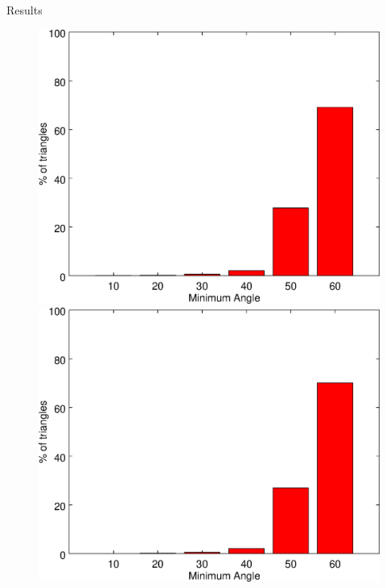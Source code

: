 \documentclass{beamer}
\begin{document}
\begin{frame}[plain]{Results}
\begin{figure}
\begin{minipage}{.31\textwidth}
      \includegraphics[width=1.0\linewidth]{../image/mp5.eps}
    \end{minipage} 
    \begin{minipage}{0.31\textwidth}
      \centering
      \includegraphics[width=1.0\linewidth]{../image/mp6.eps}
    \end{minipage}
  \end{figure}


\end{frame}
\end{document}
